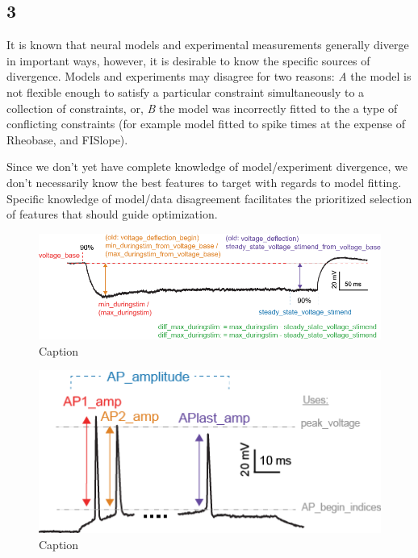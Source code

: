 

\subsection{3}

It is known that neural models and experimental measurements generally diverge in important ways, however, it is desirable to know the specific sources of divergence. Models and experiments may disagree for two reasons: \emph{A} the model is not flexible enough to satisfy a particular constraint simultaneously to a collection of constraints, or, \emph{B} the model was incorrectly fitted to the a type of conflicting constraints (for example model fitted to spike times at the expense of Rheobase, and FISlope). 

Since we don't yet have complete knowledge of model/experiment divergence, we don't necessarily know the best features to target with regards to model fitting. Specific knowledge of model/data disagreement facilitates the prioritized selection of features that should guide optimization. 

\begin{figure}
    \centering
    \includegraphics{figures/voltage_features.png}
    \caption{Caption}
    \label{fig:voltage_figures}
\end{figure}
\begin{figure}
    \centering
    \includegraphics{figures/AP_Amplitude.png}
    \caption{Caption}
    \label{fig:features_example}
\end{figure}

